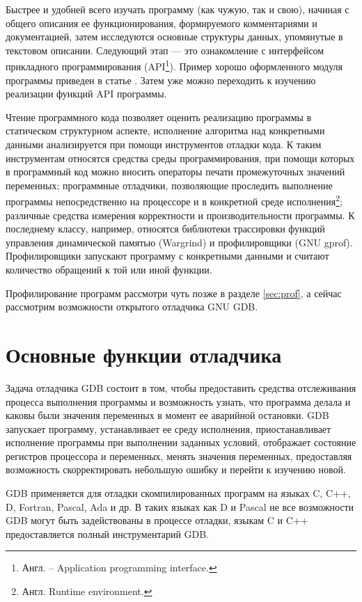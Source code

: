 \documentclass[14pt, a4paper, openany, twoside, draft]{extbook} %
\begin{document}
Быстрее и удобней всего изучать программу (как чужую, так и свою), начиная с общего описания ее функционирования, формируемого комментариями и документацией, затем исследуются основные структуры данных, упомянутые в текстовом описании.  Следующий этап --- это ознакомление с интерфейсом прикладного программирования (API\footnote{Англ. -- Application programming interface.}).  Пример хорошо оформленного модуля программы приведен в статье \cite{fogel2009}.  Затем уже можно переходить к изучению реализации функций API программы.

Чтение программного кода позволяет оценить реализацию программы в статическом структурном аспекте, исполнение алгоритма над конкретными данными анализируется при помощи инструментов отладки кода.  К таким инструментам относятся средства среды программирования, при помощи которых в программный код можно вносить операторы печати промежуточных значений переменных; программные отладчики, позволяющие проследить выполнение программы непосредственно на процессоре и в конкретной среде исполнения\footnote{Англ. Runtime environment.}; различные средства измерения корректности и производительности программы.  К последнему классу, например, относятся библиотеки трассировки функций управления динамической памятью (Wargrind) и профилировщики (GNU gprof).  Профилировщики запускают программу с конкретными данными и считают количество обращений к той или иной функции.

Профилирование программ рассмотри чуть позже в разделе \ref{sec:prof},
а сейчас рассмотрим возможности открытого отладчика GNU GDB.

\section{Основные функции отладчика}

Задача отладчика GDB состоит в том, чтобы предоставить средства отслеживания процесса выполнения программы и возможность узнать, что программа делала и каковы были значения переменных в момент ее аварийной остановки.  GDB запускает программу, устанавливает ее среду исполнения, приостанавливает исполнение программы при выполнении заданных условий, отображает состояние регистров процессора и переменных, менять значения переменных, предоставляя возможность скорректировать небольшую ошибку и перейти к изучению новой.

GDB применяется для отладки скомпилированных программ на языках C, C++, D, Fortran, Pascal, Ada и др.  В таких языках как D и Pascal не все возможности GDB могут быть задействованы в процессе отладки, языкам C и C++ предоставляется полный инструментарий GDB.
\end{document}
